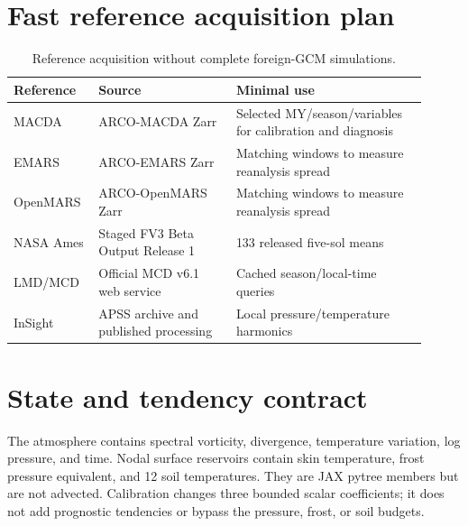 \documentclass{article}
\begin{document}
\section{Fast reference acquisition plan}
\begin{table}[h]\centering\small
\caption{Reference acquisition without complete foreign-GCM simulations.}
\begin{tabular}{p{0.17\linewidth}p{0.31\linewidth}p{0.43\linewidth}}\toprule
Reference & Source & Minimal use\\\midrule
MACDA & ARCO-MACDA Zarr & Selected MY/season/variables for calibration and diagnosis\\
EMARS & ARCO-EMARS Zarr & Matching windows to measure reanalysis spread\\
OpenMARS & ARCO-OpenMARS Zarr & Matching windows to measure reanalysis spread\\
NASA Ames & Staged FV3 Beta Output Release 1 & 133 released five-sol means\\
LMD/MCD & Official MCD v6.1 web service & Cached season/local-time queries\\
InSight & APSS archive and published processing & Local pressure/temperature
harmonics\\\bottomrule
\end{tabular}
\end{table}

\section{State and tendency contract}
The atmosphere contains spectral vorticity, divergence, temperature variation,
log pressure, and time. Nodal surface reservoirs contain skin temperature,
frost pressure equivalent, and 12 soil temperatures. They are JAX pytree members
but are not advected. Calibration changes three bounded scalar coefficients; it
does not add prognostic tendencies or bypass the pressure, frost, or soil budgets.
\end{document}
